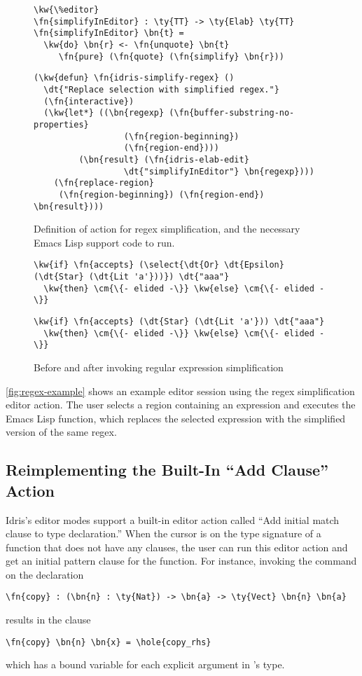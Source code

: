 \begin{figure}[H]
\begin{Verbatim}
\kw{\%editor}
\fn{simplifyInEditor} : \ty{TT} -> \ty{Elab} \ty{TT}
\fn{simplifyInEditor} \bn{t} =
  \kw{do} \bn{r} <- \fn{unquote} \bn{t}
     \fn{pure} (\fn{quote} (\fn{simplify} \bn{r}))
\end{Verbatim}
\hrulefill
\begin{Verbatim}
(\kw{defun} \fn{idris-simplify-regex} ()
  \dt{"Replace selection with simplified regex."}
  (\fn{interactive})
  (\kw{let*} ((\bn{regexp} (\fn{buffer-substring-no-properties}
                  (\fn{region-beginning})
                  (\fn{region-end})))
         (\bn{result} (\fn{idris-elab-edit}
                  \dt{"simplifyInEditor"} \bn{regexp})))
    (\fn{replace-region}
     (\fn{region-beginning}) (\fn{region-end}) \bn{result})))
\end{Verbatim}
\caption{Definition of \Elab{} action for regex simplification, and the
  necessary Emacs Lisp support code to run.}
\label{code:regexElab}
\end{figure}


\begin{figure}[ht]
\begin{Verbatim}
\kw{if} \fn{accepts} (\select{\dt{Or} \dt{Epsilon} (\dt{Star} (\dt{Lit 'a'}))}) \dt{"aaa"}
  \kw{then} \cm{\{- elided -\}} \kw{else} \cm{\{- elided -\}}
\end{Verbatim}
  \vspace{1em}
\begin{Verbatim}
\kw{if} \fn{accepts} (\dt{Star} (\dt{Lit 'a'})) \dt{"aaa"}
  \kw{then} \cm{\{- elided -\}} \kw{else} \cm{\{- elided -\}}
\end{Verbatim}
\caption{Before and after invoking regular expression simplification}
  \label{fig:regex-example}
\end{figure}

\autoref{fig:regex-example} shows an example editor session using the regex
simplification editor action. The user selects a region containing an
expression and executes the Emacs Lisp function, which replaces the selected
expression with the simplified version of the same regex.

\subsection{Reimplementing the Built-In ``Add Clause'' Action}\label{sec:addClause}

Idris's editor modes support a built-in editor action called ``Add initial match
clause to type declaration.'' When the cursor is on the type signature of a
function that does not have any clauses, the user can run this editor action
and get an initial pattern clause for the function.
For instance, invoking the command on the declaration
\begin{Verbatim}
\fn{copy} : (\bn{n} : \ty{Nat}) -> \bn{a} -> \ty{Vect} \bn{n} \bn{a}
\end{Verbatim}
results in the clause
\begin{Verbatim}
\fn{copy} \bn{n} \bn{x} = \hole{copy_rhs}
\end{Verbatim}
which has a bound variable for each explicit argument in 's type.

